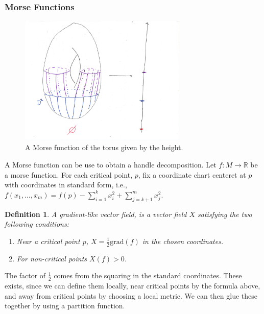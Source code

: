 \documentclass{article}
\newtheorem{definition}[theorem]{Definition}
\newtheorem{proposed work}[theorem]{Proposed Work}
\begin{document}
\subsubsection{Morse Functions}
\begin{figure}[h]
\includegraphics[width=8cm]{torusmorse.pdf}
\caption{A Morse function of the torus given by the height. \label{TorusMorse}}
\end{figure}
A Morse function can be use to obtain a handle decomposition. Let $f: M\to \mathbb{R}$ be a morse function. For each critical point, $p$, fix a coordinate chart centeret at $p$ with coordinates in standard form, i.e., $f(x_1,\ldots,x_m)=f(p)-\sum_{i=1}^k x_i^2+\sum_{j=k+1}^mx_j^2$. 
\begin{definition}
A gradient-like vector field, is a vector field $X$ satisfying the two following conditions:
\begin{enumerate}
\item Near a critical point $p$, $X=\frac{1}{2}\mathrm{grad}(f)$ in the chosen coordinates.
\item For non-critical points $X(f)>0$.
\end{enumerate}
\end{definition}
The factor of $\frac{1}{2}$ comes from the squaring in the standard coordinates. These exists, since we can define them locally, near critical points by the formula above, and away from critical points by choosing a local metric. We can then glue these together by using a partition function.
\end{document}
